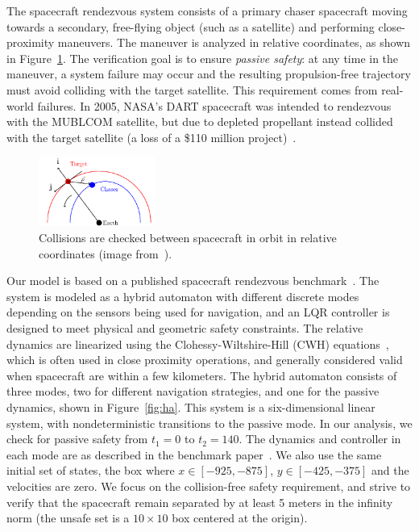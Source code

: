 %


The spacecraft rendezvous system consists of a primary chaser spacecraft moving towards a secondary, free-flying object (such as a satellite) and
performing close-proximity maneuvers.
%
The maneuver is analyzed in relative coordinates, as shown in Figure~\ref{fig:chaser}.
%
The verification goal is to ensure \emph{passive safety}: at any time in the maneuver, a system failure may occur and the resulting propulsion-free trajectory must avoid colliding with the target satellite.
%
This requirement comes from real-world failures. In 2005, NASA's DART spacecraft was intended to rendezvous with the MUBLCOM satellite, but due to depleted propellant instead collided with the target satellite (a loss of a
\$110 million project)~\cite{croomes2006overview}.

\begin{figure}
\includegraphics[width=0.34\textwidth]{images/chaser.png}
\caption{Collisions are checked between spacecraft in orbit in relative coordinates (image from~\cite{chan2017verifying}).}
\label{fig:chaser}
\end{figure}

Our model is based on a published spacecraft rendezvous benchmark~\cite{chan2017verifying,jewison2016spacecraft}.
%
The system is modeled as a hybrid automaton with different discrete modes depending on the sensors being used for navigation, and an LQR controller is designed to meet physical and geometric safety constraints.
%
The relative dynamics are linearized using the Clohessy-Wiltshire-Hill (CWH) equations~\cite{wh1960terminal},
which is often used in close proximity operations, and generally considered valid when spacecraft are within a few kilometers.
%
The hybrid automaton consists of three modes, two for different navigation strategies, and one for the passive dynamics, shown in Figure~\ref{fig:ha}.
%
This system is a six-dimensional linear system, with nondeterministic transitions to the passive mode.
%
In our analysis, we check for passive safety from $t_1=0$ to $t_2=140$.
%
The dynamics and controller in each mode are as described in the benchmark paper~\cite{chan2017verifying}.
%
We also use the same initial set of states, the box where $x \in [-925, -875]$, $y \in [-425, -375]$ and the velocities are zero.
%
We focus on the collision-free safety requirement, and strive to verify that the spacecraft remain separated by at least
5 meters in the infinity norm (the unsafe set is a $10 \times 10$ box centered at the origin).

